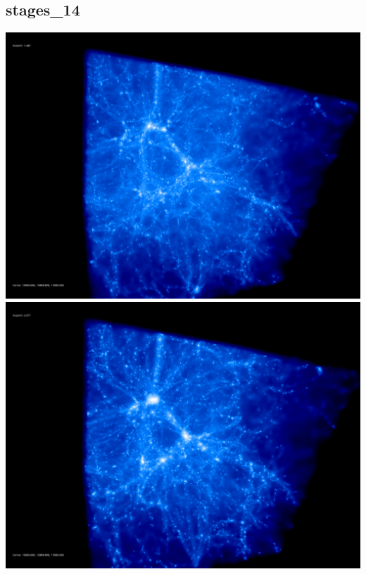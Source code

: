 \newpage
\subsection{stages\_14}

\includegraphics[scale=0.1]{stages_14/50.jpg} 
\includegraphics[scale=0.1]{stages_14/100.jpg}  \\

